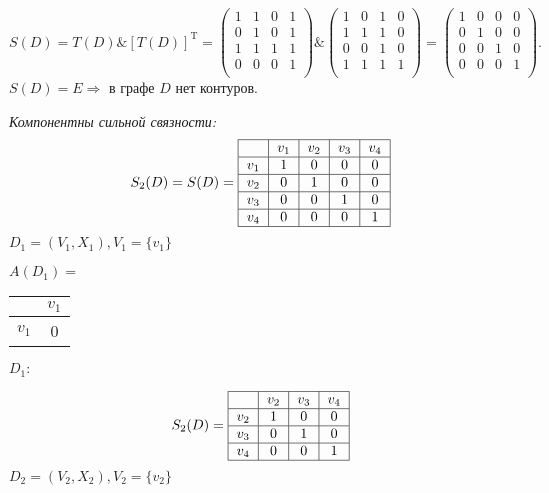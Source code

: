 \documentclass[12pt, letterpaper, titlepage]{article}
\begin{document}
\begin{equation*}
S(D) = T(D) \& [T(D)]^\mathrm{T} =     
\begin{pmatrix}
    1 & 1 & 0 & 1\\
    0 & 1 & 0 & 1\\
    1 & 1 & 1 & 1\\
    0 & 0 & 0 & 1\\
\end{pmatrix}
\&
\begin{pmatrix}
    1 & 0 & 1 & 0\\
    1 & 1 & 1 & 0\\
    0 & 0 & 1 & 0\\
    1 & 1 & 1 & 1\\
\end{pmatrix}
=
\begin{pmatrix}
    1 & 0 & 0 & 0\\
    0 & 1 & 0 & 0\\
    0 & 0 & 1 & 0\\
    0 & 0 & 0 & 1\\
\end{pmatrix}.
\end{equation*}
$S(D)=E\Rightarrow$ в графе $D$ нет контуров.

\emph{Компонентны сильной связности:}
\begin{equation*}
S_2(D) = S(D) = 
\begin{tabular}{ | c | c | c | c | c | c | } 
    \hline
    & $v_{1}$ & $v_{2}$ & $v_{3}$ & $v_{4}$\\ 
    \hline
    $v_{1}$ & 1 & 0 & 0 & 0\\ 
    \hline
    $v_{2}$ & 0 & 1 & 0 & 0\\ 
    \hline
    $v_{3}$ & 0 & 0 & 1 & 0\\
    \hline
    $v_{4}$ & 0 & 0 & 0 & 1\\
    \hline
\end{tabular}
\end{equation*}
$D_1=(V_1,X_1), V_1=\{v_1\}$

$A(D_1)=$
\begin{tabular}{|c|c|}
    \hline
    & $v_{1}$ \\ 
    \hline
    $v_{1}$ & 0 \\ 
    \hline
\end{tabular}\hspace{1cm}$D_1:$\hspace{1cm}


\begin{equation*}
    S_2(D) = 
    \begin{tabular}{ | c | c | c | c |  } 
        \hline
        & $v_{2}$ & $v_{3}$ & $v_{4}$ \\ 
        \hline
        $v_{2}$ & 1 & 0 & 0\\ 
        \hline
        $v_{3}$ & 0 & 1 & 0\\
        \hline
        $v_{4}$ & 0 & 0 & 1\\
        \hline
    \end{tabular}
\end{equation*}
$D_2=(V_2,X_2), V_2=\{v_2\}$
\end{document}
